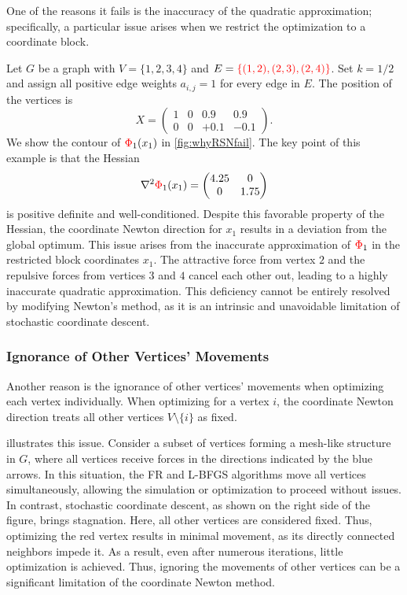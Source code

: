 \documentclass[11pt]{article}
\newcommand{\red}[1]{\textcolor{red}{#1}}
\begin{document}
One of the reasons it fails is the inaccuracy of the quadratic approximation; specifically, a particular issue arises when we restrict the optimization to a coordinate block.

Let $G$ be a graph with $V = \{1, 2, 3, 4\}$ and $E = \red{\{(1, 2), (2, 3), (2, 4)\}}$.
Set $k = 1/2$ and assign all positive edge weights $a_{i,j}= 1$ for every edge in $E$.
The position of the vertices is
\begin{equation*}
  X =
  \begin{pmatrix}
    1 & 0 & 0.9  & 0.9  \\
    0 & 0 & +0.1 & -0.1
  \end{pmatrix}.
\end{equation*}
We show the contour of $\red{\Phi}_{1}(x_{1})$ in \cref{fig:whyRSNfail}.
The key point of this example is that the Hessian
\begin{equation*}
  \nabla^{2}\red{\Phi}_{1}(x_{1}) = \mqty(4.25&0 \\
  0&1.75)
\end{equation*}
is positive definite and well-conditioned.
Despite this favorable property of the Hessian, the coordinate Newton direction for $x_{1}$ results in a deviation from the global optimum.
This issue arises from the inaccurate approximation of $\red{\Phi}_{1}$ in the restricted block coordinates $x_{1}$.
The attractive force from vertex $2$ and the repulsive forces from vertices $3$ and $4$ cancel each other out, leading to a highly inaccurate quadratic approximation.
This deficiency cannot be entirely resolved by modifying Newton's method, as it is an intrinsic and unavoidable limitation of stochastic coordinate descent.

\subsubsection{Ignorance of Other Vertices' Movements}
\label{ssec:ignorance}

Another reason is the ignorance of other vertices' movements when optimizing each vertex individually.
When optimizing for a vertex $i$, the coordinate Newton direction treats all other vertices $V \setminus \{i\}$ as fixed.

 illustrates this issue.
Consider a subset of vertices forming a mesh-like structure in $G$, where all vertices receive forces in the directions indicated by the blue arrows.
In this situation, the FR and L-BFGS algorithms move all vertices simultaneously, allowing the simulation or optimization to proceed without issues.
In contrast, stochastic coordinate descent, as shown on the right side of the figure, brings stagnation.
Here, all other vertices are considered fixed.
Thus, optimizing the red vertex results in minimal movement, as its directly connected neighbors impede it.
As a result, even after numerous iterations, little optimization is achieved.
Thus, ignoring the movements of other vertices can be a significant limitation of the coordinate Newton method.
\end{document}

